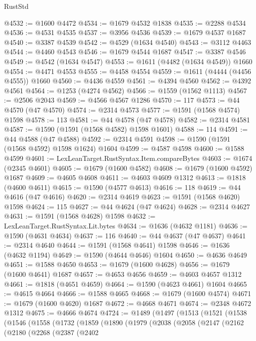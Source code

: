 \begin{lexlean}{RustStd}
\begin{coremodule}
@4532 := @1600 @4472
@4534 := @1679 @4532 @1838
@4535 := @2288 @4534
@4536 := @4531 @4535
@4537 := @3956 @4536
@4539 := @1679 @4537 @1687
@4540 := @3387 @4539
@4542 := @4529 (@1634 @4540)
@4543 := @3112 @4463
@4544 := @4460 @4543
@4546 := @1679 @4544 @1687
@4547 := @3387 @4546
@4549 := @4542 (@1634 @4547)
@4553 := @1611 (@4482 (@1634 @4549)) @1660
@4554 := @4471 @4553
@4555 := @4458 @4554
@4559 := @1611 (@4444 (@4456 @4555)) @1660
@4560 := @4436 @4559
@4561 := @4394 @4560
@4562 := @4392 @4561
@4564 := @1253 (@4274 @4562)
@4566 := @1559 (@1562 @1113)
@4567 := @2506 @2043
@4569 := @4566 @4567 @1286
@4570 := 117
@4573 := @44 @4570 (@47 @4570)
@4574 := @2314 @4573
@4577 := @1591 (@1568 @4574) @1598
@4578 := 113
@4581 := @44 @4578 (@47 @4578)
@4582 := @2314 @4581
@4587 := @1590 (@1591 (@1568 @4582) @1598 @1601)
@4588 := 114
@4591 := @44 @4588 (@47 @4588)
@4592 := @2314 @4591
@4598 := @1590 (@1591 (@1568 @4592) @1598 @1624) @1604
@4599 := @4587 @4598
@4600 := @1588 @4599
@4601 := LexLeanTarget.RustSyntax.Item.compareBytes
@4603 := @1674 (@2345 @4601)
@4605 := @1679 (@1600 @4582)
@4608 := @1679 (@1600 @4592) @1687
@4609 := @4605 @4608
@4611 := @4603 @4609 @1312
@4613 := @1818 (@4600 @4611)
@4615 := @1590 (@4577 @4613)
@4616 := 118
@4619 := @44 @4616 (@47 @4616)
@4620 := @2314 @4619
@4623 := @1591 (@1568 @4620) @1598
@4624 := 115
@4627 := @44 @4624 (@47 @4624)
@4628 := @2314 @4627
@4631 := @1591 (@1568 @4628) @1598
@4632 := LexLeanTarget.RustSyntax.Lit.bytes
@4634 := @1636 (@4632 @1181)
@4636 := @1590 (@4631 @4634)
@4637 := 116
@4640 := @44 @4637 (@47 @4637)
@4641 := @2314 @4640
@4644 := @1591 (@1568 @4641) @1598
@4646 := @1636 (@4632 @1194)
@4649 := @1590 (@4644 @4646) @1604
@4650 := @4636 @4649
@4651 := @1588 @4650
@4653 := @1679 (@1600 @4628)
@4656 := @1679 (@1600 @4641) @1687
@4657 := @4653 @4656
@4659 := @4603 @4657 @1312
@4661 := @1818 (@4651 @4659)
@4664 := @1590 (@4623 @4661) @1604
@4665 := @4615 @4664
@4666 := @1588 @4665
@4668 := @1679 (@1600 @4574)
@4671 := @1679 (@1600 @4620) @1687
@4672 := @4668 @4671
@4674 := @2348 @4672 @1312
@4675 := @4666 @4674
@4724 := @1489
    (@1497
      (@1513
        (@1521
          (@1538
            (@1546
              (@1558
                (@1732
                  (@1859
                    (@1890
                      (@1979
                        (@2038
                          (@2058
                            (@2147
                              (@2162
                                (@2180
                                  (@2268
                                    (@2387
                                      (@2402

\end{coremodule}
\end{lexlean}
